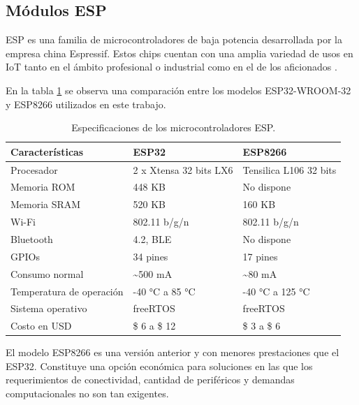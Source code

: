 \subsection{Módulos ESP}
\label{sec:Módulos ESP}
ESP es una familia de microcontroladores de baja potencia  desarrollada por la empresa china Espressif. Estos chips cuentan con una amplia variedad de usos en IoT tanto en el ámbito profesional o industrial como en el de los aficionados \citep{esp32} \citep{esp8266}. 

En la tabla \ref{tab:esp} se observa una comparación entre los modelos ESP32-WROOM-32 y ESP8266 utilizados en este trabajo.





\begin{table}[h]
\centering
\caption[Especificaciones de los microcontroladores ESP]{Especificaciones de los microcontroladores ESP.}

\begin{tabular} {p{4.5cm} p{3.7cm} p{3.7cm}} 
\toprule
\textbf{Características} & \textbf{ESP32} \citep{esp32}  & \textbf{ESP8266} \citep{esp8266} \\
\midrule
Procesador		& 2 x Xtensa 32 bits LX6	& Tensilica L106 32 bits\\
Memoria ROM	 	& 448 KB	& No dispone\\	
Memoria SRAM	& 520 KB	& 160 KB\\
Wi-Fi			& 802.11 b/g/n & 802.11 b/g/n\\
Bluetooth		& 4.2, BLE & No dispone\\
GPIOs			& 34 pines & 17 pines\\
Consumo normal	& \textasciitilde 500 mA & \textasciitilde 80 mA \\
Temperatura de operación		& -40 °C a 85 °C & -40 °C a 125 °C \\
Sistema operativo &	freeRTOS	& freeRTOS \\
Costo en USD	& \$ 6 a \$ 12  & \$ 3 a  \$ 6 \\
\bottomrule
\hline
\end{tabular}
\label{tab:esp}
\end{table}


El modelo ESP8266 es una versión anterior y con menores prestaciones que el ESP32. Constituye una opción económica para soluciones en las que los requerimientos de conectividad, cantidad de periféricos y demandas computacionales no son tan exigentes.

